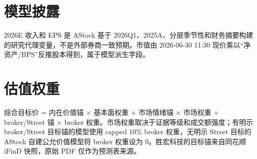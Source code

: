\section*{模型披露}
2026E 收入和 EPS 是 AStock 基于 2026Q1、2025A、分层季节性和财务摘要构建的研究代理变量，不是外部券商一致预期。市值由 2026-06-30 11:30 现价乘以“净资产/BPS”反推股本得到，属于模型派生字段。

\section*{估值权重}
综合目标价 = 内在价值锚 $\times$ 基本面权重 + 市场情绪锚 $\times$ 市场权重 + broker/Street 锚 $\times$ broker 权重。市场权重取决于证据等级和成交额强度；有明示 broker/Street 目标锚的模型使用 capped 10\% broker 权重，无明示 Street 目标的 AStock 自建公允价值模型将 broker 权重设为 0。胜宏科技的目标锚来自同花顺 iFinD 快照，原始 PDF 仅作为预测表来源。

